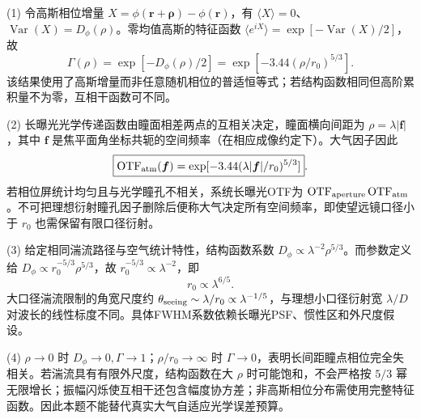 (1) 令高斯相位增量 \(X=\phi(\boldsymbol r+\boldsymbol\rho)-\phi(\boldsymbol r)\)，有 \(\langle X\rangle=0\)、\(\operatorname{Var}(X)=D_\phi(\rho)\)。零均值高斯的特征函数 \(\langle e^{iX}\rangle=\exp[-\operatorname{Var}(X)/2]\)，故
\[
\boxed{\Gamma(\rho)=\exp[-D_\phi(\rho)/2]
=\exp[-3.44(\rho/r_0)^{5/3}]}.
\]
该结果使用了高斯增量而非任意随机相位的普适恒等式；若结构函数相同但高阶累积量不为零，互相干函数可不同。

(2) 长曝光光学传递函数由瞳面相差两点的互相关决定，瞳面横向间距为 \(\rho=\lambda|\boldsymbol f|\)，其中 \(\boldsymbol f\) 是焦平面角坐标共轭的空间频率（在相应成像约定下）。大气因子因此
\[
\boxed{\operatorname{OTF}_{\rm atm}(\boldsymbol f)
=\exp[-3.44(\lambda|\boldsymbol f|/r_0)^{5/3}]}.
\]
若相位屏统计均匀且与光学瞳孔不相关，系统长曝光OTF为 \(\operatorname{OTF}_{\rm aperture}\operatorname{OTF}_{\rm atm}\)。不可把理想衍射瞳孔因子删除后便称大气决定所有空间频率，即使望远镜口径小于 \(r_0\) 也需保留有限口径衍射。

(3) 给定相同湍流路径与空气统计特性，结构函数系数 \(D_\phi\propto\lambda^{-2}\rho^{5/3}\)。而参数定义给 \(D_\phi\propto r_0^{-5/3}\rho^{5/3}\)，故 \(r_0^{-5/3}\propto\lambda^{-2}\)，即
\[
\boxed{r_0\propto\lambda^{6/5}}.
\]
大口径湍流限制的角宽尺度约 \(\theta_{\rm seeing}\sim\lambda/r_0\propto\lambda^{-1/5}\)，与理想小口径衍射宽 \(\lambda/D\) 对波长的线性标度不同。具体FWHM系数依赖长曝光PSF、惯性区和外尺度假设。

(4) \(\rho\to0\) 时 \(D_\phi\to0,\Gamma\to1\)；\(\rho/r_0\to\infty\) 时 \(\Gamma\to0\)，表明长间距瞳点相位完全失相关。若湍流具有有限外尺度，结构函数在大 \(\rho\) 时可能饱和，不会严格按 \(5/3\) 幂无限增长；振幅闪烁使互相干还包含幅度协方差；非高斯相位分布需使用完整特征函数。因此本题不能替代真实大气自适应光学误差预算。
